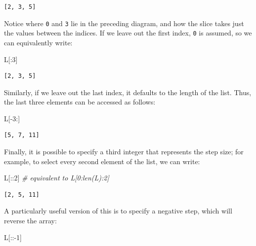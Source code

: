 \documentclass[]{article}
\newenvironment{Shaded}{}{}
\newcommand{\DecValTok}[1]{\textcolor[rgb]{0.25,0.63,0.44}{{#1}}}
\newcommand{\CommentTok}[1]{\textcolor[rgb]{0.38,0.63,0.69}{\textit{{#1}}}}
\newcommand{\OperatorTok}[1]{\textcolor[rgb]{0.40,0.40,0.40}{{#1}}}
\newcommand{\NormalTok}[1]{{#1}}
\begin{document}
\begin{verbatim}
[2, 3, 5]
\end{verbatim}

Notice where \texttt{0} and \texttt{3} lie in the preceding diagram, and
how the slice takes just the values between the indices. If we leave out
the first index, \texttt{0} is assumed, so we can equivalently write:

\begin{Shaded}
\begin{Highlighting}[]
\NormalTok{L[:}\DecValTok{3}\NormalTok{]}
\end{Highlighting}
\end{Shaded}

\begin{verbatim}
[2, 3, 5]
\end{verbatim}

Similarly, if we leave out the last index, it defaults to the length of
the list. Thus, the last three elements can be accessed as follows:

\begin{Shaded}
\begin{Highlighting}[]
\NormalTok{L[}\OperatorTok{-}\DecValTok{3}\NormalTok{:]}
\end{Highlighting}
\end{Shaded}

\begin{verbatim}
[5, 7, 11]
\end{verbatim}

Finally, it is possible to specify a third integer that represents the
step size; for example, to select every second element of the list, we
can write:

\begin{Shaded}
\begin{Highlighting}[]
\NormalTok{L[::}\DecValTok{2}\NormalTok{]  }\CommentTok{# equivalent to L[0:len(L):2]}
\end{Highlighting}
\end{Shaded}

\begin{verbatim}
[2, 5, 11]
\end{verbatim}

A particularly useful version of this is to specify a negative step,
which will reverse the array:

\begin{Shaded}
\begin{Highlighting}[]
\NormalTok{L[::}\OperatorTok{-}\DecValTok{1}\NormalTok{]}
\end{Highlighting}
\end{Shaded}
\end{document}
